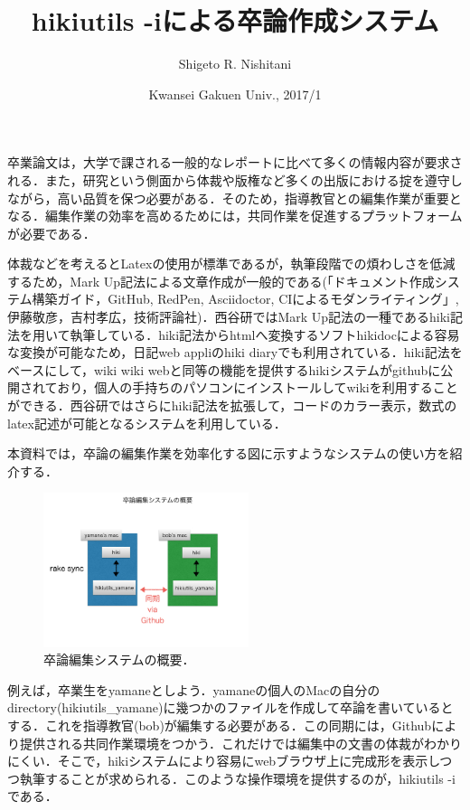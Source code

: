 \title{hikiutils -iによる卒論作成システム}
\author{Shigeto R. Nishitani}
\date{ Kwansei Gakuen Univ., 2017/1}
\maketitle
卒業論文は，大学で課される一般的なレポートに比べて多くの情報内容が要求される．また，研究という側面から体裁や版権など多くの出版における掟を遵守しながら，高い品質を保つ必要がある．そのため，指導教官との編集作業が重要となる．編集作業の効率を高めるためには，共同作業を促進するプラットフォームが必要である．

体裁などを考えるとLatexの使用が標準であるが，執筆段階での煩わしさを低減するため，Mark Up記法による文章作成が一般的である(「ドキュメント作成システム構築ガイド，GitHub, RedPen, Asciidoctor, CIによるモダンライティング」, 伊藤敬彦，吉村孝広，技術評論社)．西谷研ではMark Up記法の一種であるhiki記法を用いて執筆している．hiki記法からhtmlへ変換するソフトhikidocによる容易な変換が可能なため，日記web appliのhiki diaryでも利用されている．hiki記法をベースにして，wiki wiki webと同等の機能を提供するhikiシステムがgithubに公開されており，個人の手持ちのパソコンにインストールしてwikiを利用することができる．西谷研ではさらにhiki記法を拡張して，コードのカラー表示，数式のlatex記述が可能となるシステムを利用している．

本資料では，卒論の編集作業を効率化する図に示すようなシステムの使い方を紹介する．

\begin{figure}[htbp]\begin{center}
\includegraphics[width=6cm,bb=0 0 442 500]{../figs/./hikiutils_bob.002.jpeg}
\caption{卒論編集システムの概要．}
\label{default}\end{center}\end{figure}
例えば，卒業生をyamaneとしよう．yamaneの個人のMacの自分のdirectory(hikiutils\_yamane)に幾つかのファイルを作成して卒論を書いているとする．これを指導教官(bob)が編集する必要がある．この同期には，Githubにより提供される共同作業環境をつかう．これだけでは編集中の文書の体裁がわかりにくい．そこで，hikiシステムにより容易にwebブラウザ上に完成形を表示しつつ執筆することが求められる．このような操作環境を提供するのが，hikiutils -iである．

